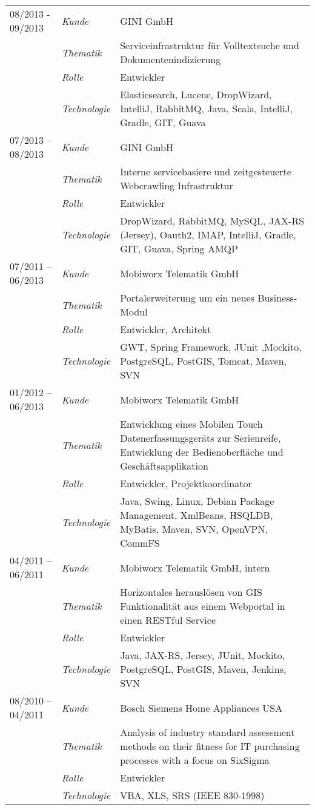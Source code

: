 \begin{longtable}{@{}>{}p{4cm}>{\itshape}p{3cm}>{}p{9cm}}
08/2013 - 09/2013 & Kunde & GINI GmbH\\
&	Thematik &	Serviceinfrastruktur für Volltextsuche und
		Dokumentenindizierung\\
&Rolle&Entwickler\\
&Technologie& Elasticsearch, Lucene, DropWizard, IntelliJ, RabbitMQ, Java,
		Scala, IntelliJ, Gradle, GIT, Guava\\

07/2013 -- 08/2013 & Kunde & GINI GmbH\\
& Thematik&Interne servicebasiere und zeitgesteuerte
		Webcrawling Infrastruktur\\
& Rolle & Entwickler\\
& Technologie	& DropWizard, RabbitMQ, MySQL, JAX-RS (Jersey), Oauth2, IMAP,
			IntelliJ, Gradle, GIT, Guava, Spring AMQP \\

07/2011 -- 06/2013 & Kunde & Mobiworx Telematik GmbH \\
& Thematik &	Portalerweiterung  um ein neues Business-Modul \\
& Rolle & Entwickler, Architekt\\
& Technologie	& GWT, Spring Framework,	JUnit ,Mockito,
	PostgreSQL, PostGIS, Tomcat, Maven, SVN \\

01/2012 -- 06/2013 & Kunde & Mobiworx Telematik GmbH \\
& Thematik & Entwicklung eines Mobilen Touch Datenerfassungsgeräts
			zur Serienreife, Entwicklung der Bedienoberfläche und
			Geschäftsapplikation\\
& Rolle & Entwickler, Projektkoordinator\\
& Technologie & 	Java, Swing, Linux, Debian Package Management, XmlBeans,
				HSQLDB, MyBatis, Maven, SVN, OpenVPN, CommFS \\

04/2011 -- 06/2011 & Kunde & Mobiworx Telematik GmbH, intern\\
& Thematik & Horizontales herauslösen von GIS Funktionalität aus einem
				Webportal in einen RESTful Service \\
& Rolle & Entwickler \\
& Technologie	& Java, JAX-RS, Jersey, JUnit, Mockito,  PostgreSQL, PostGIS,
				Maven, Jenkins, SVN \\

08/2010 -- 04/2011 & 	Kunde & 	Bosch Siemens Home Appliances USA\\
& Thematik & Analysis of industry standard assessment methods on their
				fitness for IT purchasing processes with a focus on SixSigma \\
& Rolle & Entwickler\\
&Technologie & VBA, XLS, SRS (IEEE 830-1998)\\

\end{longtable}
